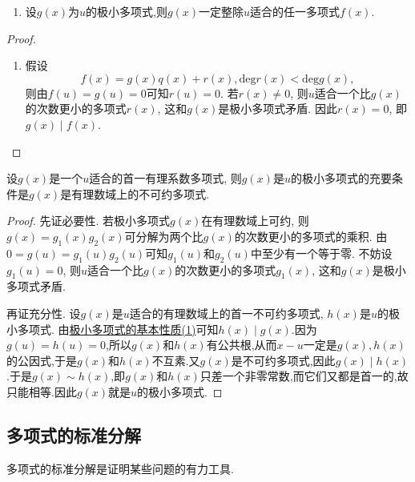 \documentclass[lang=cn,newtx,10pt,scheme=chinese]{elegantbook}
\begin{document}
\begin{proposition}[极小多项式的基本性质]\label{proposition:极小多项式的基本性质}
\begin{enumerate}[(1)]
\item 设$g(x)$为$u$的极小多项式,则$g(x)$一定整除\(u\)适合的任一多项式\(f(x)\).
\end{enumerate}
\end{proposition}
\begin{proof}
\begin{enumerate}[(1)]
\item 假设
\[
f(x)=g(x)q(x)+r(x), \mathrm{deg }r(x)<\mathrm{deg }g(x),
\]
则由\(f(u)=g(u)=0\)可知\(r(u)=0\). 若\(r(x)\neq 0\), 则\(u\)适合一个比\(g(x)\)的次数更小的多项式\(r(x)\), 这和\(g(x)\)是极小多项式矛盾. 因此\(r(x)=0\), 即\(g(x)\mid f(x)\). 
\end{enumerate}
\end{proof}

\begin{proposition}[极小多项式式的充要条件]\label{proposition:极小多项式式的充要条件}
设\(g(x)\)是一个\(u\)适合的首一有理系数多项式, 则\(g(x)\)是\(u\)的极小多项式的充要条件是\(g(x)\)是有理数域上的不可约多项式.
\end{proposition}
\begin{proof}
先证必要性. 若极小多项式\(g(x)\)在有理数域上可约, 则\(g(x)=g_1(x)g_2(x)\)可分解为两个比\(g(x)\)的次数更小的多项式的乘积. 由\(0 = g(u)=g_1(u)g_2(u)\)可知\(g_1(u)\)和\(g_2(u)\)中至少有一个等于零. 不妨设\(g_1(u)=0\), 则\(u\)适合一个比\(g(x)\)的次数更小的多项式\(g_1(x)\), 这和\(g(x)\)是极小多项式矛盾. 

再证充分性. 设\(g(x)\)是\(u\)适合的有理数域上的首一不可约多项式, \(h(x)\)是\(u\)的极小多项式. 由\hyperref[proposition:极小多项式的基本性质]{极小多项式的基本性质(1)}可知\(h(x)\mid g(x)\).因为$g(u)=h(u)=0$,所以$g(x)$和$h(x)$有公共根,从而$x-u$一定是$g(x),h(x)$的公因式,于是$g(x)$和$h(x)$不互素.又\(g(x)\)是不可约多项式,因此$g(x)\mid h(x)$.于是$g(x)\sim h(x)$,即\(g(x)\)和\(h(x)\)只差一个非零常数,而它们又都是首一的,故只能相等.因此\(g(x)\)就是\(u\)的极小多项式.
\end{proof}

\subsection{多项式的标准分解}

多项式的标准分解是证明某些问题的有力工具.
\end{document}
